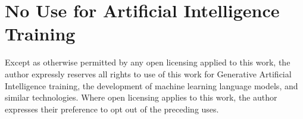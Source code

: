 \chapter*{No Use for Artificial Intelligence Training}

Except as otherwise permitted by any open licensing applied to this work, the author expressly reserves all rights to use of this work for Generative Artificial Intelligence training, the development of machine learning language models, and similar technologies. Where open licensing applies to this work, the author expresses their preference to opt out of the preceding uses.
